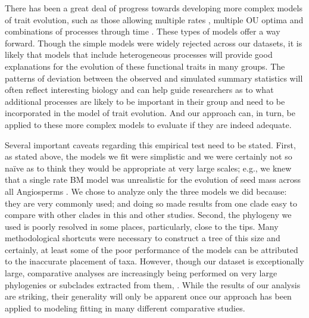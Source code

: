 \documentclass[a4paper,12pt]{article}
\begin{document}
There has been a great deal of progress towards developing more complex models of trait evolution, such as those allowing multiple rates \citep{Omeara2006, Eastman2011}, multiple OU optima \citep{ButlerKing2004, Beaulieu2012, UyedaBayou} and combinations of processes through time \citep{SlaterMEE}. These types of models offer a way forward. Though the simple models were widely rejected across our datasets, it is likely that models that include heterogeneous processes will provide good explanations for the evolution of these functional traits in many groups. The patterns of deviation between the observed and simulated summary statistics will often reflect interesting biology and can help guide researchers as to what additional processes are likely to be important in their group and need to be incorporated in the model of trait evolution. And our approach can, in turn, be applied to these more complex models to evaluate if they are indeed adequate.
 

Several important caveats regarding this empirical test need to be stated. First, as stated above, the models we fit were simplistic and we were certainly not so na\"{i}ve as to think they would be appropriate at very large scales; e.g., we knew that a single rate BM model was unrealistic for the evolution of seed mass across all Angiosperms \citep{Moles2005}. We chose to analyze only the three models we did because: they are very commonly used; and doing so made results from one clade easy to compare with other clades in this and other studies. Second, the phylogeny we used is poorly resolved in some places, particularly, close to the tips. Many methodological shortcuts were necessary to construct a tree of this size and certainly, at least some of the poor performance of the models can be attributed to the inaccurate placement of taxa. However, though our dataset is exceptionally large, comparative analyses are increasingly being performed on very large phylogenies or subclades extracted from them, \citep{Coopermammal, Jetz2012, Rabosky2013, PyronBurbrink2013, ksi}. While the results of our analysis are striking, their generality will only be apparent once our approach has been applied to modeling fitting in many different comparative studies.
\end{document}
